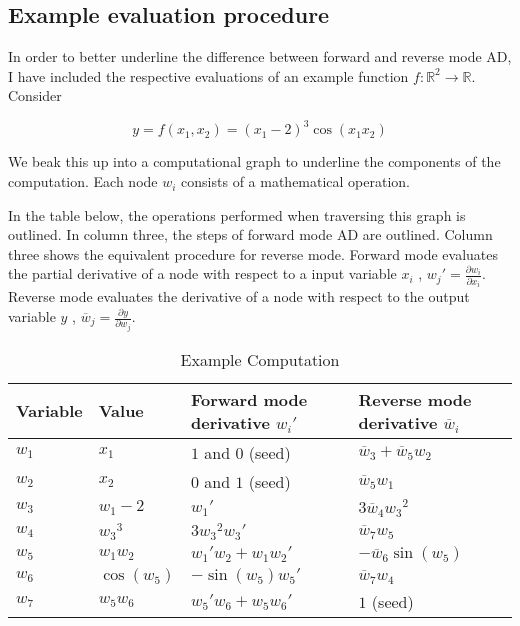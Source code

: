 \documentclass[11pt]{article}
\begin{document}
\subsection{Example evaluation procedure}

In order to better underline the difference between forward and reverse mode AD, I have included the respective evaluations of an example function $ f:\mathbb{R}^2 \rightarrow \mathbb{R} $. Consider 

\[ y = f(x_1, x_2)=(x_1-2)^3\cos(x_1x_2) \]

We beak this up into a computational graph to underline the components of the computation. Each node $ w_i $ consists of a mathematical operation.


In the table below, the operations performed when traversing this graph is outlined. In column three, the steps of forward mode AD are outlined. Column three shows the equivalent procedure for reverse mode. 
Forward mode evaluates the partial derivative of a node with respect to a input variable $ x_i $ , ${w_j}' = \frac{\partial w_i}{\partial x_i} $. Reverse mode evaluates the derivative of a node with respect to the output variable $ y $ , $ \overline w_j = \frac{\partial y}{\partial w_j} $.

\begin{table}[]
\centering
\caption{Example Computation}
\label{my-label}
\begin{tabular}{|l|l|l|l|}
\hline
Variable  & Value & Forward mode derivative ${w_i}'$ & Reverse mode derivative $ \overline w_i $                      \\ \hline
$ w_1 $ & $ x_1 $                   & $ 1 $ and $ 0 $ (seed)                                 & $ \overline{w}_3 +  \overline{w}_5 w_2 $ \\ \hline
$ w_2 $ & $ x_2 $                   & $ 0 $ and $ 1 $ (seed)                                 & $ \overline{w}_5 w_1 $                   \\ \hline
$ w_3 $ & $ w_1-2 $                 & $ {w_1}' $                                                 & $ 3\overline{w}_4 {w_3}^2 $              \\ \hline
$ w_4 $ & $ {w_3}^3 $               & $ 3{w_3}^2{w_3}' $                                         & $ \overline{w}_7 w_5 $                   \\ \hline
$ w_5 $ & $ w_1w_2 $                & $ {w_1}' w_2+w_1 {w_2}' $                                  & $ - \overline{w}_6 \sin(w_5) $          \\ \hline
$ w_6 $ & $ \cos(w_5) $             & $ -\sin(w_5){w_5}' $                                       & $ \overline{w}_7 {w_4} $                 \\ \hline
$ w_7 $ & $ w_5w_6 $                & $ {w_5}'w_6+w_5{w_6}' $                                    & $ 1 $ (seed)                            \\ \hline
\end{tabular}
\end{table}
\end{document}
